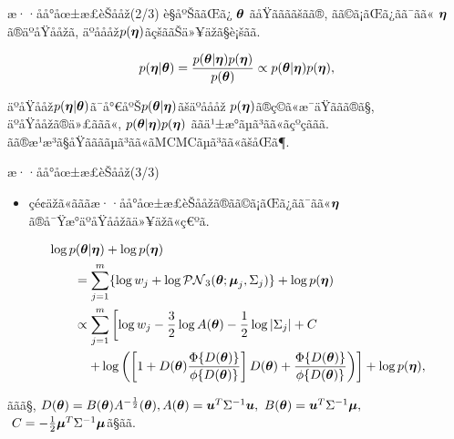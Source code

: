\documentclass[dvipdfmx]{beamer} %
\newcommand{\bm}[1]{\mbox{\boldmath $#1$}}
\begin{document}
\begin{frame}{æ··åå°åœ±æ­£èŠååž(2/3)}
è§åºŠããŒã¿ $\bm \theta$ ãåŸããããšãã®, ãã©ã¡ãŒã¿ãã¯ãã« $\bm \eta$ã®äºåŸååžã, äºåååž$p(\bm \eta)$ãçšããŠä»¥äžã§è¡šãã.

\begin{eqnarray*}
p(\bm \eta | \bm \theta) = \frac{p(\bm \theta | \bm \eta) p(\bm \eta)}{p(\bm \theta)} \propto p(\bm \theta | \bm \eta) p(\bm \eta),
\end{eqnarray*}

\noindent
äºåŸååž$p(\bm \eta | \bm \theta)$ã¯å°€åºŠ$p(\bm \theta | \bm \eta)$ãšäºåååž $p(\bm \eta)$ã®ç©ã«æ¯äŸããã®ã§, äºåŸååžã®ä»£ããã«, $p(\bm \theta | \bm \eta) p(\bm \eta)$ ããä¹±æ°ãµã³ãã«ãçºçããã. ãã®æ¹æ³ã§åŸããããµã³ãã«ãMCMCãµã³ãã«ãšåŒã¶. 
\end{frame}
\begin{frame}{æ··åå°åœ±æ­£èŠååž(3/3)}

\begin{itemize}
	\item çé¢äžã«ãããæ··åå°åœ±æ­£èŠååžã®ãã©ã¡ãŒã¿ãã¯ãã«$\bm \eta$ã®å¯Ÿæ°äºåŸååžãä»¥äžã«ç€ºã.
\end{itemize}

\vspace{-0.5cm}
\begin{align*}
&\log p(\bm \theta | \bm \eta) + \log p(\bm \eta) \\
&\quad \quad = \sum^m_{j=1} \{\log w_j + \log \mathcal{PN}_3(\bm \theta;\bm \mu_j, \Sigma_j)\} + \log p(\bm \eta) \\
&\quad \quad \propto \sum^m_{j=1} \left[ \log w_j - \frac{3}{2} \log A(\bm \theta) - \frac{1}{2} \log |\Sigma_j| + C \right. \\
&\quad \quad \quad \left. + \log \left( \left[1 + D(\bm \theta) \frac{\Phi \{D(\bm \theta)\}}{\phi \{D(\bm \theta)\}} \right] D(\bm \theta) + \frac{\Phi \{D(\bm \theta)\}}{\phi \{D(\bm \theta)\}} \right) \right] + \log p(\bm \eta), 
\end{align*}

\noindent
ããã§, $D(\bm \theta) = B(\bm \theta) A^{-\frac{1}{2}}(\bm \theta),
A(\bm \theta) = \bm u^T \Sigma^{-1} \bm u,\ B(\bm \theta) = \bm u^T \Sigma^{-1} \bm \mu,$ $\ C = -\frac{1}{2} \bm \mu^T \Sigma^{-1} \bm \mu$ã§ãã.
\end{frame}

\end{document}
